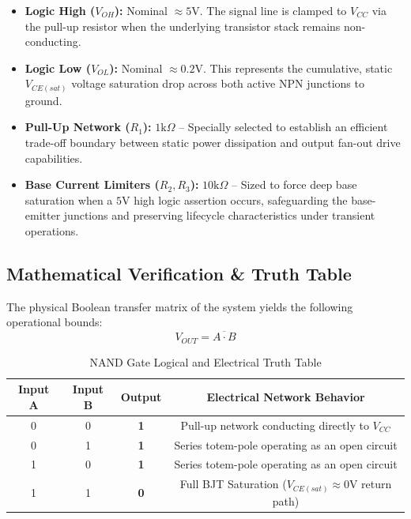 \documentclass[11pt,letterpaper]{article}
\begin{document}
\begin{itemize}
    \item \textbf{Logic High ($V_{OH}$):} Nominal $\approx 5\text{V}$. The signal line is clamped to $V_{CC}$ via the pull-up resistor when the underlying transistor stack remains non-conducting.
    \item \textbf{Logic Low ($V_{OL}$):} Nominal $\approx 0.2\text{V}$. This represents the cumulative, static $V_{CE(sat)}$ voltage saturation drop across both active NPN junctions to ground.
    \item \textbf{Pull-Up Network ($R_1$):} $1\text{k}\Omega$ -- Specially selected to establish an efficient trade-off boundary between static power dissipation and output fan-out drive capabilities.
    \item \textbf{Base Current Limiters ($R_2, R_3$):} $10\text{k}\Omega$ -- Sized to force deep base saturation when a $5\text{V}$ high logic assertion occurs, safeguarding the base-emitter junctions and preserving lifecycle characteristics under transient operations.
\end{itemize}

\subsection{Mathematical Verification \& Truth Table}
The physical Boolean transfer matrix of the system yields the following operational bounds:
\begin{equation}
    V_{OUT} = \overline{A \cdot B}
\end{equation}

\begin{table}[!h]
\centering
\caption{NAND Gate Logical and Electrical Truth Table}
\vspace{2mm}
\begin{tabular}{cccc}
\toprule
\textbf{Input A} & \textbf{Input B} & \textbf{Output} & \textbf{Electrical Network Behavior} \\
\midrule
0 & 0 & \textbf{1} & Pull-up network conducting directly to $V_{CC} $ \\
0 & 1 & \textbf{1} & Series totem-pole operating as an open circuit \\
1 & 0 & \textbf{1} & Series totem-pole operating as an open circuit \\
1 & 1 & \textbf{0} & Full BJT Saturation ($V_{CE(sat)} \approx 0\text{V}$ return path) \\
\bottomrule
\end{tabular}
\label{tab:truth_table}
\end{table}
\end{document}
